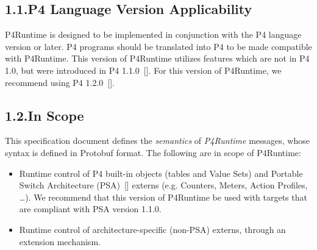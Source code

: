 \documentclass[11pt]{article}
\begin{document}
{%
\subsection{1.1.\hspace*{0.5em}P4 Language Version Applicability}\label{sec-p4-language-version-applicability}%

\noindent{}P4Runtime is designed to be implemented in conjunction with the P4 language
version or later. P4 programs should be translated into P4 to be made
compatible with P4Runtime. This version of P4Runtime utilizes features which are
not in P4 1.0, but were introduced in P4 1.1.0~[]. For
this version of P4Runtime, we recommend using P4 1.2.0~[].%

\subsection{1.2.\hspace*{0.5em}In Scope}\label{sec-in-scope}%

\noindent{}This specification document defines the \emph{semantics} of \emph{P4Runtime} messages,
whose syntax is defined in Protobuf format. The following are in scope of
P4Runtime:%

\begin{itemize}[noitemsep,topsep=\mdcompacttopsep]%

\item{}Runtime control of P4 built-in objects (tables and Value Sets) and Portable
Switch Architecture (PSA)~[] externs (e.g. Counters, Meters, Action
Profiles, \dots{}). We recommend that this version of P4Runtime be used with
targets that are compliant with PSA version 1.1.0.%

\item{}Runtime control of architecture-specific (non-PSA) externs, through an
extension mechanism.%


\end{itemize}}
\end{document}
